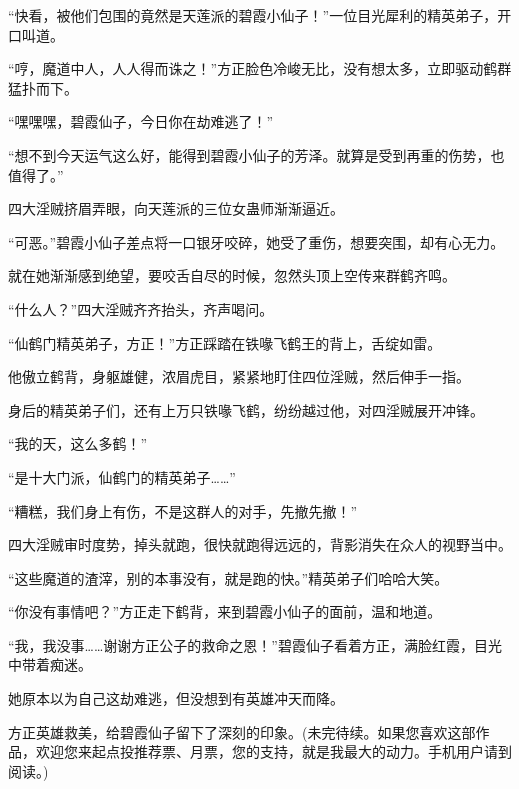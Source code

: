 \begin{this_body}
“快看，被他们包围的竟然是天莲派的碧霞小仙子！”一位目光犀利的精英弟子，开口叫道。

“哼，魔道中人，人人得而诛之！”方正脸色冷峻无比，没有想太多，立即驱动鹤群猛扑而下。

“嘿嘿嘿，碧霞仙子，今日你在劫难逃了！”

“想不到今天运气这么好，能得到碧霞小仙子的芳泽。就算是受到再重的伤势，也值得了。”

四大淫贼挤眉弄眼，向天莲派的三位女蛊师渐渐逼近。

“可恶。”碧霞小仙子差点将一口银牙咬碎，她受了重伤，想要突围，却有心无力。

就在她渐渐感到绝望，要咬舌自尽的时候，忽然头顶上空传来群鹤齐鸣。

“什么人？”四大淫贼齐齐抬头，齐声喝问。

“仙鹤门精英弟子，方正！”方正踩踏在铁喙飞鹤王的背上，舌绽如雷。

他傲立鹤背，身躯雄健，浓眉虎目，紧紧地盯住四位淫贼，然后伸手一指。

身后的精英弟子们，还有上万只铁喙飞鹤，纷纷越过他，对四淫贼展开冲锋。

“我的天，这么多鹤！”

“是十大门派，仙鹤门的精英弟子……”

“糟糕，我们身上有伤，不是这群人的对手，先撤先撤！”

四大淫贼审时度势，掉头就跑，很快就跑得远远的，背影消失在众人的视野当中。

“这些魔道的渣滓，别的本事没有，就是跑的快。”精英弟子们哈哈大笑。

“你没有事情吧？”方正走下鹤背，来到碧霞小仙子的面前，温和地道。

“我，我没事……谢谢方正公子的救命之恩！”碧霞仙子看着方正，满脸红霞，目光中带着痴迷。

她原本以为自己这劫难逃，但没想到有英雄冲天而降。

方正英雄救美，给碧霞仙子留下了深刻的印象。(未完待续。如果您喜欢这部作品，欢迎您来起点投推荐票、月票，您的支持，就是我最大的动力。手机用户请到阅读。)

\end{this_body}

